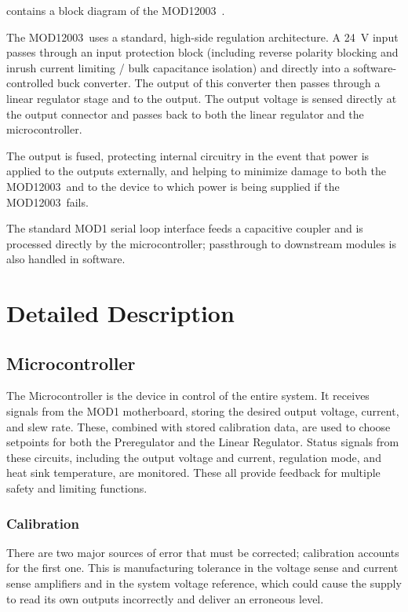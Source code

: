 \documentclass[a4paper,twocolumn,10pt,openany,oneside,final,fleqn]{memoir}
\newcommand{\Model}{MOD12003\ }
\begin{document}
 contains a block diagram of the \Model.

The \Model uses a standard, high-side regulation architecture. A \SI{24}{V} input
passes through an input protection block (including reverse polarity blocking and
inrush current limiting / bulk capacitance isolation) and directly into a software-controlled
buck converter. The output of this converter then passes through a linear regulator
stage and to the output. The output voltage is sensed directly at the output connector
and passes back to both the linear regulator and the microcontroller.

The output is fused, protecting internal circuitry in the event that power
is applied to the outputs externally, and helping to minimize damage to both the
\Model and to the device to which power is being supplied if the \Model fails.

The standard MOD1 serial loop interface feeds a capacitive coupler and is
processed directly by the microcontroller; passthrough to downstream modules is
also handled in software.

\section{Detailed Description}

\subsection{Microcontroller}

The Microcontroller is the device in control of the entire system. It receives signals
from the MOD1 motherboard, storing the desired output voltage, current, and slew rate.
These, combined with stored calibration data, are used to choose setpoints for both the
Preregulator and the Linear Regulator. Status signals from these circuits, including
the output voltage and current, regulation mode, and heat sink temperature, are monitored.
These all provide feedback for multiple safety and limiting functions.

\subsubsection{Calibration}

There are two major sources of error that must be corrected; calibration accounts for the
first one. This is manufacturing tolerance in the voltage sense and current sense amplifiers
and in the system voltage reference, which could cause the supply to read its own outputs
incorrectly and deliver an erroneous level.
\end{document}
